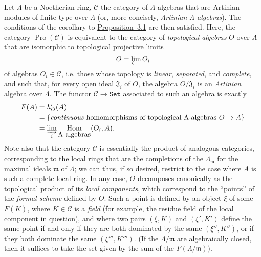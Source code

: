 \documentclass{article}
\renewcommand{\cal}[1]{{\mathcal{#1}}}
\newcommand{\fk}[1]{{\mathfrak{#1}}}
\newcommand{\Set}{\mathtt{Set}}
\DeclareMathOperator{\Hom}{Hom}
\DeclareMathOperator{\Pro}{Pro}
\newcommand{\oldpage}[1]{\marginpar{\footnotesize$\Big\vert$ \textit{p.~#1}}}
\begin{document}
Let $\Lambda$ be a Noetherian ring, $\cal{C}$ the category of $\Lambda$-algebras that are Artinian modules of finite type over $\Lambda$ (or, more concisely,
\oldpage{195-07}
\emph{Artinian $\Lambda$-algebras}).
The conditions of the corollary to \hyperref[A.3-proposition1]{Proposition~3.1} are then satisfied.
Here, the category $\Pro(\cal{C})$ is equivalent to the category of \emph{topological algebras} $O$ over $\Lambda$ that are isomorphic to topological projective limits
\[
  O = \varprojlim O_i
\]
of algebras $O_i\in\cal{C}$, i.e. those whose topology is \emph{linear}, \emph{separated}, and \emph{complete}, and such that, for every open ideal $\fk{J}_i$ of $O$, the algebra $O/\fk{J}_i$ is an \emph{Artinian} algebra over $\Lambda$.
The functor $\cal{C}\to\Set$ associated to such an algebra is exactly
\[
  \begin{aligned}
    F(A)
    &= h'_{O}(A)
  \\&= \{\mbox{\emph{continuous} homomorphisms of topological $\Lambda$-algebras $O\to A$}\}
  \\&= \varinjlim_i \Hom_{\mbox{$\Lambda$-algebras}}(O_i,A).
  \end{aligned}
\]
Note also that the category $\cal{C}$ is essentially the product of analogous categories, corresponding to the local rings that are the completions of the $\Lambda_{\fk{m}}$ for the maximal ideals $\fk{m}$ of $\Lambda$;
we can thus, if so desired, restrict to the case where $A$ is such a complete local ring.
In any case, $O$ decomposes canonically as the topological product of its \emph{local components}, which correspond to the ``points'' of the \emph{formal scheme} \cite{2} defined by $O$.
Such a point is defined by an object $\xi$ of some $F(K)$, where $K\in\cal{C}$ is a \emph{field} (for example, the residue field of the local component in question), and where two pairs $(\xi,K)$ and $(\xi',K')$ define the same point if and only if they are both dominated by the same $(\xi'',K'')$, or if they both dominate the same $(\xi''',K''')$.
(If the $\Lambda/\fk{m}$ are algebraically closed, then it suffices to take the set given by the sum of the $F(\Lambda/\fk{m})$).
\end{document}
